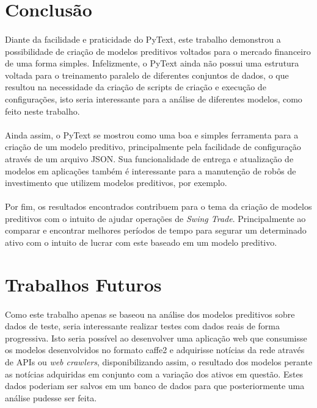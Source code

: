 \documentclass[grad,numbers]{coppe}
\begin{document}
  	\section{Conclusão}
  		\paragraph{}Diante da facilidade e praticidade do PyText, este trabalho demonstrou a possibilidade de criação de modelos preditivos voltados para o mercado financeiro de uma forma simples. Infelizmente, o PyText ainda não possui uma estrutura voltada para o treinamento paralelo de diferentes conjuntos de dados, o que resultou na necessidade da criação de scripts de criação e execução de configurações, isto seria interessante para a análise de diferentes modelos, como feito neste trabalho. \paragraph{}Ainda assim, o PyText se mostrou como uma boa e simples ferramenta para a criação de um modelo preditivo, principalmente pela facilidade de configuração através de um arquivo JSON. Sua funcionalidade de entrega e atualização de modelos em aplicações também é interessante para a manutenção de robôs de investimento que utilizem modelos preditivos, por exemplo.
  		\paragraph{}Por fim, os resultados encontrados contribuem para o tema da criação de modelos preditivos com o intuito de ajudar operações de \textit{Swing Trade}. Principalmente ao comparar e encontrar melhores períodos de tempo para segurar um determinado ativo com o intuito de lucrar com este baseado em um modelo preditivo.
 		\section{Trabalhos Futuros}
 			\paragraph{}Como este trabalho apenas se baseou na análise dos modelos preditivos sobre dados de teste, seria interessante realizar testes com dados reais de forma progressiva. Isto seria possível ao desenvolver uma aplicação web que consumisse os modelos desenvolvidos no formato caffe2 e adquirisse notícias da rede através de APIs ou \textit{web crawlers}, disponibilizando assim, o resultado dos modelos perante as notícias adquiridas em conjunto com a variação dos ativos em questão. Estes dados poderiam ser salvos em um banco de dados para que posteriormente uma análise pudesse ser feita.
\end{document}
